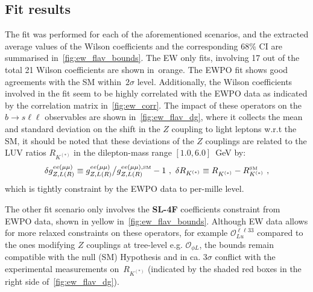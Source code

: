 \subsection{Fit results}
\label{sec:EFT_results}
\par The fit was performed for each of the aforementioned scenarios, and the extracted average values of the Wilson coefficients and the corresponding 68\% CI are summarised in~\autoref{fig:ew_flav_bounds}. The EW only fits, involving 17 out of the total 21 Wilson coefficients are shown in~\textcolor[HTML]{be3d04}{orange}. The EWPO fit shows good agreements with the SM within~$2\sigma$ level. Additionally, the Wilson coefficients involved in the fit seem to be highly correlated with the EWPO data as indicated by the correlation matrix in~\autoref{fig:ew_corr}. 
The impact of these operators on the $ b \to s \ell \ell$ observables are shown in~\autoref{fig:ew_flav_dg}, where  it collects the mean and standard deviation on the shift in the $Z$ coupling to light leptons w.r.t the SM, it should be noted that these deviations of the $Z$ couplings are related to the LUV ratios   $R_{K^{(*)}}$ in the dilepton-mass range $[1.0,6.0]$~GeV by: 
\begin{equation}
	\label{eq:SMdev}
	\delta g_{Z,L(R)}^{ee(\mu\mu)} \equiv g_{Z,L(R)}^{ee(\mu\mu)}{\big/}g_{Z,L(R)}^{ee(\mu\mu),\textrm{\tiny SM}}-1  \ , \ \delta R_{K^{(*)}} \equiv R_{K^{(*)}}^{ } - R_{K^{(*)}}^{\textrm{\tiny SM}} \ ,
\end{equation}
which is tightly constraint by the EWPO data to per-mille level. \\
\par The other fit scenario only involves the \textbf{ SL-4F} coefficients constraint from EWPO data, shown in \textcolor[HTML]{c2b109}{yellow}  in~\autoref{fig:ew_flav_bounds}. Although EW data allows for more relaxed constraints on these operators, for example $\mathcal{O}_{Lu}^{\ell \ell 33}$ compared to the ones modifying $Z$ couplings at tree-level e.g. $\mathcal{O}_{\phi L}$, the bounds remain compatible with the null (SM) Hypothesis and in ca. $3\sigma$ conflict with the experimental measurements on~$R_{K^{(*)}}$  (indicated by the shaded red boxes in the right side of~\autoref{fig:ew_flav_dg}).  

